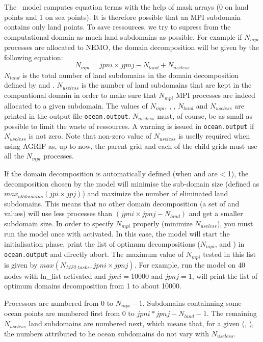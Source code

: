 \documentclass[../main/NEMO_manual]{subfiles}
\begin{document}
The \NEMO\ model computes equation terms with the help of mask arrays (0 on land points and 1 on sea points). It is therefore possible that an MPI subdomain contains only land points. To save ressources, we try to supress from the computational domain as much land subdomains as possible. For example if $N_{mpi}$ processes are allocated to NEMO, the domain decomposition will be given by the following equation:
\[
  N_{mpi} = jpni \times jpnj - N_{land} + N_{useless}
\]
$N_{land}$ is the total number of land subdomains in the domain decomposition defined by  and . $N_{useless}$ is the number of land subdomains that are kept in the compuational domain in order to make sure that $N_{mpi}$ MPI processes are indeed allocated to a given subdomain. The values of $N_{mpi}$, , ,  $N_{land}$ and $N_{useless}$ are printed in the output file \texttt{ocean.output}. $N_{useless}$ must, of course, be as small as possible to limit the waste of ressources. A warning is issued in  \texttt{ocean.output} if $N_{useless}$ is not zero. Note that non-zero value of $N_{useless}$ is uselly required when using AGRIF as, up to now, the parent grid and each of the child grids must use all the $N_{mpi}$ processes.

If the domain decomposition is automatically defined (when  and  are < 1), the decomposition chosen by the model will minimise the sub-domain size (defined as $max_{all domains}(jpi \times jpj)$) and maximize the number of eliminated land subdomains. This means that no other domain decomposition (a set of  and  values) will use less processes than $(jpni  \times  jpnj - N_{land})$ and get a smaller subdomain size.
In order to specify $N_{mpi}$ properly (minimize $N_{useless}$), you must run the model once with  activated. In this case, the model will start the initialisation phase, print the list of optimum decompositions ($N_{mpi}$,  and ) in \texttt{ocean.output} and directly abort. The maximum value of $N_{mpi}$ tested in this list is given by $max(N_{MPI\_tasks}, jpni \times jpnj)$. For example, run the model on 40 nodes with ln\_list activated and $jpni = 10000$ and $jpnj = 1$, will print the list of optimum domains decomposition from 1 to about 10000.

Processors are numbered from 0 to $N_{mpi} - 1$. Subdomains containning some ocean points are numbered first from 0 to $jpni * jpnj - N_{land} -1$. The remaining $N_{useless}$ land subdomains are numbered next, which means that, for a given (, ), the numbers attributed to he ocean subdomains do not vary with $N_{useless}$.
\end{document}
